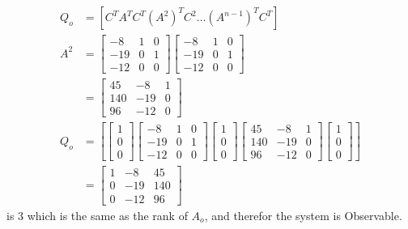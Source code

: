 \documentclass[main.tex]{subfiles}
\begin{document}
\begin{enumerate}
\begin{enumerate}
    $$
    \begin{aligned}
    Q_o &= \left[C^T A^T C^T\left(A^2\right)^T C^2 \ldots\left(A^{n-1}\right)^T C^T\right]\\
    A^2 &= \left[\begin{array}{lll}
    -8 & 1 & 0 \\
    -19 & 0 & 1 \\
    -12 & 0 & 0
    \end{array}\right] \left[\begin{array}{lll}
    -8 & 1 & 0 \\
    -19 & 0 & 1 \\
    -12 & 0 & 0
    \end{array}\right]\\
    & = \left[\begin{array}{ccc}
    45 & -8 & 1 \\
    140 & -19 & 0 \\
    96 & -12 & 0
    \end{array}\right] \\
    Q_o &= \left[ \left[\begin{array}{l}
    1 \\
    0 \\
    0
    \end{array}\right] \left[\begin{array}{lll}
    -8 & 1 & 0 \\
    -19 & 0 & 1 \\
    -12 & 0 & 0
    \end{array}\right] \left[\begin{array}{l}
    1 \\
    0 \\
    0
    \end{array}\right] \left[\begin{array}{ccc}
    45 & -8 & 1 \\
    140 & -19 & 0 \\
    96 & -12 & 0
    \end{array}\right] \left[\begin{array}{l}
    1 \\
    0 \\
    0
    \end{array}\right] \right] \\
    & = \left[\begin{array}{lll}
    1 & -8 & 45\\
    0 & -19 & 140 \\
    0 & -12 & 96
    \end{array} \right]
    \end{aligned}
    $$
    is 3 which is the same as the rank of $A_o$, and therefor the system is Observable.    
\end{enumerate}

\end{enumerate}
\end{document}
